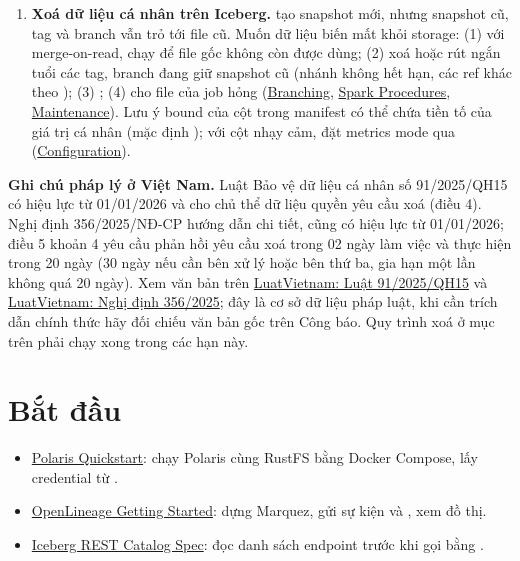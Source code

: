 \begin{enumerate}
  \item \textbf{Xoá dữ liệu cá nhân trên Iceberg.}  tạo snapshot mới, nhưng snapshot cũ, tag và branch vẫn trỏ tới file cũ. Muốn dữ liệu biến mất khỏi storage: (1) với merge-on-read, chạy  để file gốc không còn được dùng; (2) xoá hoặc rút ngắn tuổi các tag, branch đang giữ snapshot cũ (nhánh  không hết hạn, các ref khác theo ); (3) ; (4)  cho file của job hỏng (\href{https://iceberg.apache.org/docs/latest/branching/}{Branching}, \href{https://iceberg.apache.org/docs/latest/spark-procedures/}{Spark Procedures}, \href{https://iceberg.apache.org/docs/latest/maintenance/}{Maintenance}). Lưu ý bound của cột trong manifest có thể chứa tiền tố của giá trị cá nhân (mặc định ); với cột nhạy cảm, đặt metrics mode  qua  (\href{https://iceberg.apache.org/docs/latest/configuration/}{Configuration}).
\end{enumerate}

\begin{ghichu}
\textbf{Ghi chú pháp lý ở Việt Nam.} Luật Bảo vệ dữ liệu cá nhân số 91/2025/QH15 có hiệu lực từ 01/01/2026 và cho chủ thể dữ liệu quyền yêu cầu xoá (điều 4). Nghị định 356/2025/NĐ-CP hướng dẫn chi tiết, cũng có hiệu lực từ 01/01/2026; điều 5 khoản 4 yêu cầu phản hồi yêu cầu xoá trong 02 ngày làm việc và thực hiện trong 20 ngày (30 ngày nếu cần bên xử lý hoặc bên thứ ba, gia hạn một lần không quá 20 ngày). Xem văn bản trên \href{https://english.luatvietnam.vn/dan-su/law-on-personal-data-protection-law-no-91-2025-qh15-405135-d1.html}{LuatVietnam: Luật 91/2025/QH15} và \href{https://luatvietnam.vn/dan-su/nghi-dinh-356-2025-nd-cp-quy-dinh-chi-tiet-luat-bao-ve-du-lieu-ca-nhan-422896-d1.html}{LuatVietnam: Nghị định 356/2025}; đây là cơ sở dữ liệu pháp luật, khi cần trích dẫn chính thức hãy đối chiếu văn bản gốc trên Công báo. Quy trình xoá ở mục trên phải chạy xong trong các hạn này.
\end{ghichu}

\section{Bắt đầu}
\begin{itemize}
  \item \href{https://polaris.apache.org/guides/quickstart/}{Polaris Quickstart}: chạy Polaris cùng RustFS bằng Docker Compose, lấy credential từ .
  \item \href{https://openlineage.io/getting-started/}{OpenLineage Getting Started}: dựng Marquez, gửi sự kiện  và , xem đồ thị.
  \item \href{https://iceberg.apache.org/rest-catalog-spec/}{Iceberg REST Catalog Spec}: đọc danh sách endpoint trước khi gọi bằng .
\end{itemize}

